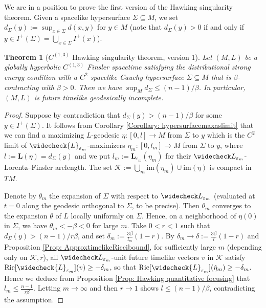\documentclass[a4paper,11pt]{article}
\numberwithin{equation}{section}
\theoremstyle{definition}
\theoremstyle{plain}
\newtheorem{Theorem}[Definition]{Theorem}
\newcommand{\eps}{\varepsilon}
\newcommand{\Ric}{\mathrm{Ric}}
\begin{document}
We are in a position to prove the first version of the Hawking singularity theorem.
Given a spacelike hypersurface $\Sigma \subseteq M$, we set $d_\Sigma(y):=\sup_{x \in \Sigma}d(x,y)$ for $y \in M$ (note that $d_\Sigma(y)>0$ if and only if $y \in I^+(\Sigma) =\bigcup_{x \in \Sigma} I^+(x)$). 


\begin{Theorem}[$C^{(1,3)}$ Hawking singularity theorem, version 1]
\label{Theorem: unweighted Hawking 1}
Let $(M,L)$ be a globally hyperbolic $C^{(1,3)}$ Finsler spacetime satisfying the distributional strong energy condition with a $C^2$ spacelike Cauchy hypersurface $\Sigma \subseteq M$ that is $\beta$-contracting with $\beta > 0$. 
Then we have $\sup_M d_\Sigma \leq (n-1)/\beta$. 
In particular, $(M,L)$ is future timelike geodesically incomplete.
\end{Theorem}


\begin{proof}
    Suppose by contradiction that $d_\Sigma(y) > (n-1)/\beta$ for some $y \in I^+(\Sigma)$. 
    It follows from Corollary \ref{Corollary: hypersurfacemaxaslimit} that we can find a maximizing $L$-geodesic $\eta:[0,l] \to M$ from $\Sigma$ to $y$ which is the $C^2$ limit of $\widecheck{L}_{\eps_m}$-maximizers $\eta_m:[0,l_m] \to M$ from $\Sigma$ to $y$, where $l:=\mathbf L(\eta)=d_\Sigma(y)$ and we put $l_m := \mathbf L_{\eps_m}(\eta_m)$ for their $\widecheck L_{\varepsilon_m}$-Lorentz--Finsler arclength. 
    The set $\mathcal K:=\bigcup_m \mathrm{im}(\dot{\eta}_m) \cup \mathrm{im}(\dot{\eta})$ is compact in $TM$. 

    Denote by $\theta_m$ the expansion of $\Sigma$ with respect to $\widecheck L_{\eps_m}$ (evaluated at $t=0$ along the geodesic orthogonal to $\Sigma$, to be precise). 
    Then $\theta_m$ converges to the expansion $\theta$ of $L$ locally uniformly on $\Sigma$. 
    Hence, on a neighborhood of $\eta(0)$ in $\Sigma$, we have $\theta_m < -\beta < 0$ for large $m$. 
    Take $0 < r < 1$ such that $d_\Sigma(y) > (n-1)/r\beta$, and set $\delta_m:=\frac{3\beta}{l_m}(1-r)$. 
    By $\delta_m \to \delta :=\frac{3\beta}{l}(1-r)$ and Proposition \ref{Prop: ApproxtimelikeRiccibound}, for sufficiently large $m$ (depending only on $\mathcal K,r$), all $\widecheck L_{\eps_m}$-unit future timelike vectors $v$ in $\mathcal K$ satisfy $\Ric[\widecheck{L}_{\eps_m}](v) \geq -\delta_m$, so that $\Ric[\widecheck{L}_{\eps_m}](\dot{\eta}_m) \geq -\delta_m$.
    Hence we deduce from Proposition \ref{Prop: Hawking quantitative focusing} that $l_m \leq \frac{n-1}{r\beta}$. 
    Letting $m \to \infty$ and then $r \to 1$ shows $l \leq (n-1)/\beta$, contradicting the assumption.
\end{proof}
\end{document}
